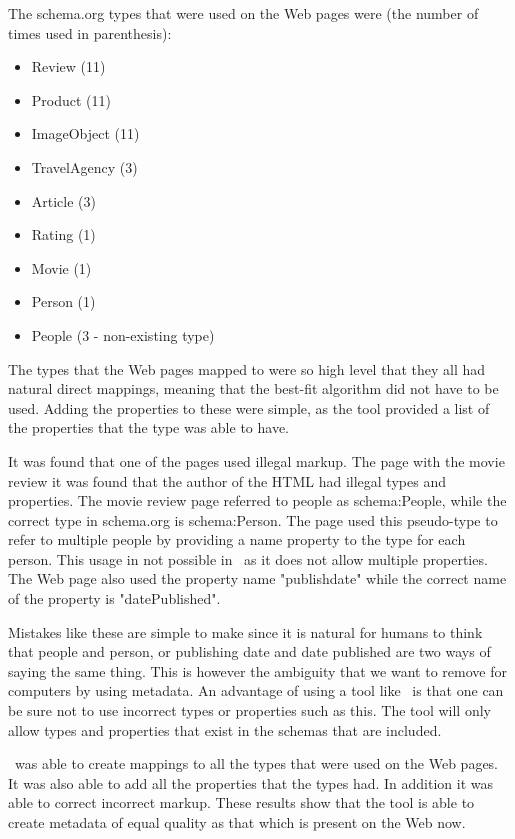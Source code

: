 The schema.org types that were used on the Web pages were (the number of times used in parenthesis):

\begin{itemize}
	\item Review (11)
	\item Product (11)
	\item ImageObject (11)
	\item TravelAgency (3)
	\item Article (3)
	\item Rating (1)
	\item Movie (1)
	\item Person (1)
	\item People (3 - non-existing type)
\end{itemize}

The types that the Web pages mapped to were so high level that they all had natural direct mappings,
meaning that the best-fit algorithm did not have to be used.
Adding the properties to these were simple,
as the tool provided a list of the properties that the type was able to have.

It was found that one of the pages used illegal markup.
The page with the movie review it was found that the author of the HTML had illegal types and properties.
The movie review page referred to people as schema:People, while the correct type in schema.org is schema:Person.
The page used this pseudo-type to refer to multiple people by providing a name property to the type for each person.
This usage in not possible in \theartefact\ as it does not allow multiple properties.
The Web page also used the property name "publishdate" while the correct name of the property is "datePublished".

Mistakes like these are simple to make since it is natural for humans to think that people and person,
or publishing date and date published are two ways of saying the same thing.
This is however the ambiguity that we want to remove for computers by using metadata.
An advantage of using a tool like \theartefact\ is that one can be sure not to use incorrect types or properties such as this.
The tool will only allow types and properties that exist in the schemas that are included.

\Theartefact\ was able to create mappings to all the types that were used on the Web pages.
It was also able to add all the properties that the types had.
In addition it was able to correct incorrect markup.
These results show that the tool is able to create metadata of equal quality as that which is present on the Web now.

